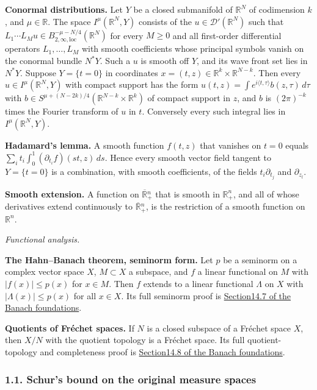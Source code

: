 \documentclass[
  11pt,
]{article}
\begin{document}
\textbf{Conormal distributions.} Let \(Y\) be a closed submanifold of
\(\mathbb R^N\) of codimension \(k\), and \(\mu\in\mathbb R\). The space
\(I^\mu(\mathbb R^N,Y)\) consists of the
\(u\in\mathcal D'(\mathbb R^N)\) such that
\(L_1\cdots L_Mu\in B^{-\mu-N/4}_{2,\infty,\mathrm{loc}}(\mathbb R^N)\)
for every \(M\geq0\) and all first-order differential operators
\(L_1,\ldots,L_M\) with smooth coefficients whose principal symbols
vanish on the conormal bundle \(N^*Y\). Such a \(u\) is smooth off
\(Y\), and its wave front set lies in \(N^*Y\). Suppose \(Y=\{t=0\}\) in
coordinates \(x=(t,z)\in\mathbb R^k\times\mathbb R^{N-k}\). Then every
\(u\in I^\mu(\mathbb R^N,Y)\) with compact support has the form
\(u(t,z)=\int e^{i\langle t,\tau\rangle}b(z,\tau)\,d\tau\) with
\(b\in S^{\mu+(N-2k)/4}(\mathbb R^{N-k}\times\mathbb R^k)\) of compact
support in \(z\), and \(b\) is \((2\pi)^{-k}\) times the Fourier
transform of \(u\) in \(t\). Conversely every such integral lies in
\(I^\mu(\mathbb R^N,Y)\).

\textbf{Hadamard's lemma.} A smooth function \(f(t,z)\) that vanishes on
\(t=0\) equals \(\sum_it_i\int_0^1(\partial_{t_i}f)(st,z)\,ds\). Hence
every smooth vector field tangent to \(Y=\{t=0\}\) is a combination,
with smooth coefficients, of the fields \(t_i\partial_{t_j}\) and
\(\partial_{z_l}\).

\textbf{Smooth extension.} A function on \(\overline{\mathbb R}{}^n_+\)
that is smooth in \(\mathbb R^n_+\), and all of whose derivatives extend
continuously to \(\overline{\mathbb R}{}^n_+\), is the restriction of a
smooth function on \(\mathbb R^n\).

\emph{Functional analysis.}

\textbf{The Hahn--Banach theorem, seminorm form.} Let \(p\) be a
seminorm on a complex vector space \(X\), \(M\subset X\) a subspace, and
\(f\) a linear functional on \(M\) with \(|f(x)|\leq p(x)\) for
\(x\in M\). Then \(f\) extends to a linear functional \(\Lambda\) on
\(X\) with \(|\Lambda(x)|\leq p(x)\) for all \(x\in X\). Its full
seminorm proof is
\href{banach-foundation-bridges.pdf\#section*.63}{Section14.7
of the Banach foundations}.

\textbf{Quotients of Fréchet spaces.} If \(N\) is a closed subspace of a
Fréchet space \(X\), then \(X/N\) with the quotient topology is a
Fréchet space. Its full quotient-topology and completeness proof is
\href{banach-foundation-bridges.pdf\#section*.67}{Section14.8
of the Banach foundations}.

\subsubsection{1.1. Schur's bound on the original measure
spaces}\label{schurs-bound-on-the-original-measure-spaces}
\hypertarget{AN03-TC-SCHUR-001}{}\label{AN03-TC-SCHUR-001}
\end{document}
